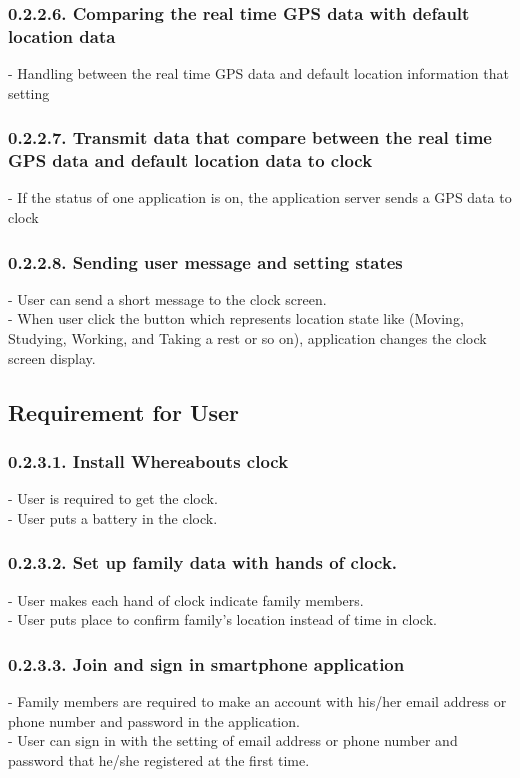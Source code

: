 \documentclass[10pt,a4paper,twocolumn]{report}
\begin{document}
		\subsubsection{0.2.2.6. Comparing the real time GPS data with default location data}
		- Handling between the real time GPS data and default location information that setting \\
		
		\subsubsection{0.2.2.7. Transmit data that compare between the real time GPS data and default location data to clock}
		- If the status of one application is on, the application server sends a GPS data to clock \\
		
		\subsubsection{0.2.2.8. Sending user message and setting states}
		- User can send a short message to the clock screen. \\
		- When user click the button which represents location state like (Moving, Studying, Working, and Taking a rest or so 
		  on), application changes the clock screen display. \\
 
     \subsection{Requirement for User}
     	\subsubsection{0.2.3.1. Install Whereabouts clock}
     	- User is required to get the clock. \\
		- User puts a battery in the clock. \\
		
		\subsubsection{0.2.3.2. Set up family data with hands of clock.}
     	- User makes each hand of clock indicate family members. \\
		- User puts place to confirm family’s location instead of time in clock.\\
		
		\subsubsection{0.2.3.3. Join and sign in smartphone application}
     	- Family members are required to make an account with his/her email address or phone number and 		  password in the application.\\
		- User can sign in with the setting of email address or phone number and password that he/she 			  registered at the first time.\\
		
\end{document}

